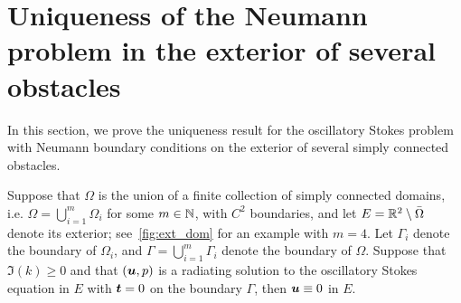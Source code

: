 \section{Uniqueness of the Neumann problem in the exterior
  of several obstacles}
\label{app:neuuniqueness}
In this section, we prove the uniqueness result for the oscillatory
Stokes problem with Neumann boundary conditions on the exterior
of several simply connected obstacles. 
\begin{thrm}
  Suppose that $\Omega$ is the union of a finite collection 
  of simply connected domains, i.e. $\Omega = \bigcup_{i=1}^m \Omega_{i}$
  for some $m \in \mathbb{N}$, with $C^{2}$ boundaries, 
  and let $E = \mathbb{R}^{2} \setminus \bar{\Omega}$ denote its exterior;
  see~\cref{fig:ext_dom} for an example with $m=4$.
  Let $\Gamma_{i}$ denote the boundary of $\Omega_{i}$, 
  and $\Gamma = \bigcup_{i=1}^{m} \Gamma_{i}$ denote the boundary
  of $\Omega$.
  Suppose that $\Im(k)\geq 0$ and 
  that $({\boldsymbol u},p)$ is a radiating solution to the oscillatory Stokes
  equation in $E$ with ${\boldsymbol t} = 0$ on the boundary $\Gamma$, then
  ${\boldsymbol u} \equiv 0$ in $E$.
\end{thrm}

